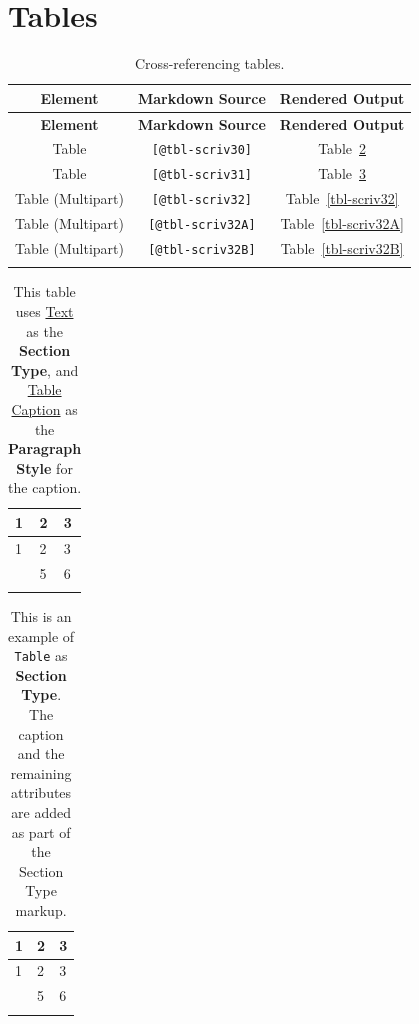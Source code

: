 \documentclass[
  12pt,
  a4paper,
  oneside,
  numbers=noenddot,
  titlepage,
  toclink=all,
  toc=bibliography]{scrbook}
\theoremstyle{definition}
\theoremstyle{definition}
\theoremstyle{definition}
\theoremstyle{plain}
\theoremstyle{plain}
\theoremstyle{plain}
\theoremstyle{plain}
\theoremstyle{plain}
\theoremstyle{remark}
\begin{document}
\newpage{}

\hypertarget{sec-scriv29}{%
\section{Tables}\label{sec-scriv29}}

\hypertarget{tbl-scriv29}{}
\begin{longtable}[]{@{}ccc@{}}
\toprule\noalign{}
\textbf{Element} & \textbf{Markdown Source} & \textbf{Rendered
Output} \\
\midrule\noalign{}
\endfirsthead
\toprule\noalign{}
\textbf{Element} & \textbf{Markdown Source} & \textbf{Rendered
Output} \\
\midrule\noalign{}
\endhead
\bottomrule\noalign{}
\endlastfoot
Table & \texttt{{[}@tbl-scriv30{]}} &
\protect\hypertarget{cite_82}{}{\label{cite_82}Table~\ref{tbl-scriv30}} \\
Table & \texttt{{[}@tbl-scriv31{]}} &
\protect\hypertarget{cite_83}{}{\label{cite_83}Table~\ref{tbl-scriv31}} \\
Table (Multipart) & \texttt{{[}@tbl-scriv32{]}} &
\protect\hypertarget{cite_84}{}{\label{cite_84}Table~\ref{tbl-scriv32}} \\
Table (Multipart) & \texttt{{[}@tbl-scriv32A{]}} &
\protect\hypertarget{cite_85}{}{\label{cite_85}Table~\ref{tbl-scriv32A}} \\
Table (Multipart) & \texttt{{[}@tbl-scriv32B{]}} &
\protect\hypertarget{cite_86}{}{\label{cite_86}Table~\ref{tbl-scriv32B}} \\
\caption{\label{tbl-scriv29}Cross-referencing tables.}\tabularnewline
\end{longtable}

\hypertarget{tbl-scriv30}{}
\begin{longtable}[]{@{}lll@{}}
\toprule\noalign{}
1 & 2 & 3 \\
\midrule\noalign{}
\endfirsthead
\toprule\noalign{}
1 & 2 & 3 \\
\midrule\noalign{}
\endhead
\bottomrule\noalign{}
\endlastfoot
4 & 5 & 6 \\
\caption{\label{tbl-scriv30}This table uses \ul{Text} as the
\textbf{Section Type}, and \ul{Table Caption} as the \textbf{Paragraph
Style} for the caption.}\tabularnewline
\end{longtable}

\hypertarget{tbl-scriv31}{}
\begin{longtable}[]{@{}lll@{}}
\toprule\noalign{}
1 & 2 & 3 \\
\midrule\noalign{}
\endfirsthead
\toprule\noalign{}
1 & 2 & 3 \\
\midrule\noalign{}
\endhead
\bottomrule\noalign{}
\endlastfoot
4 & 5 & 6 \\
\caption{\label{tbl-scriv31}This is an example of \texttt{Table} as
\textbf{Section Type}. The caption and the remaining attributes are
added as part of the Section Type markup.}\tabularnewline
\end{longtable}
\end{document}

